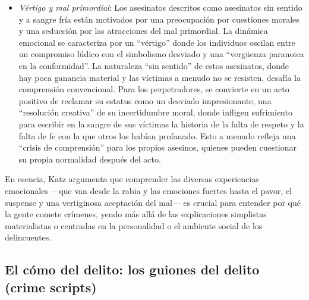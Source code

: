 \documentclass[
  spanish,
  letterpaper,
  DIV=11,
  numbers=noendperiod]{scrreprt}
\begin{document}
\begin{tcolorbox}
\begin{itemize}
  consecuencias mundanas'' de sus acciones. Para persistir en el atraco,
  cultivan una ``dureza'' y una ``maldad moral'', impulsadas por el
  compromiso de que su voluntad prevalezca, independientemente del
  interés propio práctico. La violencia, incluso cuando parece
  ``irracional'', puede ser instrumental para construir una reputación
  de ``malote'' y asegurar su posición entre sus compañeros. La
  seducción es provocada por las atracciones existenciales de ser
  ``malo'' como una forma de ser celebrada colectivamente que trasciende
  el bien y el mal.
\item
  \emph{Vértigo y mal primordial}: Los asesinatos descritos como
  asesinatos sin sentido y a sangre fría están motivados por una
  preocupación por cuestiones morales y una seducción por las
  atracciones del mal primordial. La dinámica emocional se caracteriza
  por un ``vértigo'' donde los individuos oscilan entre un compromiso
  lúdico con el simbolismo desviado y una ``vergüenza paranoica en la
  conformidad''. La naturaleza ``sin sentido'' de estos asesinatos,
  donde hay poca ganancia material y las víctimas a menudo no se
  resisten, desafía la comprensión convencional. Para los perpetradores,
  se convierte en un acto positivo de reclamar su estatus como un
  desviado impresionante, una ``resolución creativa'' de su
  incertidumbre moral, donde infligen sufrimiento para escribir en la
  sangre de sus víctimas la historia de la falta de respeto y la falta
  de fe con la que otros los habían profanado. Esto a menudo refleja una
  ``crisis de comprensión'' para los propios asesinos, quienes pueden
  cuestionar su propia normalidad después del acto.
\end{itemize}

En esencia, Katz argumenta que comprender las diversas experiencias
emocionales ---que van desde la rabia y las emociones fuertes hasta el
pavor, el suspense y una vertiginosa aceptación del mal--- es crucial
para entender por qué la gente comete crímenes, yendo más allá de las
explicaciones simplistas materialistas o centradas en la personalidad o
el ambiente social de los delincuentes.

\end{tcolorbox}

\subsection{El cómo del delito: los guiones del delito (crime
scripts)}\label{el-cuxf3mo-del-delito-los-guiones-del-delito-crime-scripts}
\end{document}

